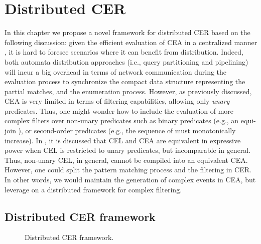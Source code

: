 \chapter{Distributed CER}\label{chapter:distributed-cer}

In this chapter we propose a novel framework for distributed CER based on the following discussion: given the efficient evaluation of CEA in a centralized manner \cite{formal-framework-cer, core}, it is hard to foresee scenarios where it can benefit from distribution. Indeed, both automata distribution approaches (i.e., query partitioning and pipelining) will incur a big overhead in terms of network communication during the evaluation process to synchronize the compact data structure representing the partial matches, and the enumeration process. However, as previously discussed, CEA is very limited in terms of filtering capabilities, allowing only \emph{unary} predicates. Thus, one might wonder how to include the evaluation of more complex filters over non-unary predicates such as binary predicates (e.g., an equi-join ), or second-order predicates (e.g., the sequence of  must monotonically increase). In \cite{on-the-expressiveness}, it is discussed that CEL and CEA are equivalent in expressive power when CEL is restricted to unary predicates, but incomparable in general. Thus, non-unary CEL, in general, cannot be compiled into an equivalent CEA. However, one could split the pattern matching process and the filtering in CER. In other words, we would maintain the generation of complex events in CEA, but leverage on a distributed framework for complex filtering.

\section{Distributed CER framework}\label{sec:framework}

\begin{figure}[t]
  \centering
  \caption{Distributed CER framework.}
  \label{fig:framework}
\end{figure}


